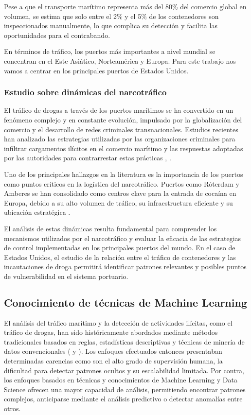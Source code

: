 \documentclass[12pt]{article}
\begin{document}
		Pese a que el transporte marítimo representa más del 80\% del comercio global en volumen, se estima que solo entre el 2\% y el 5\% de los contenedores son inspeccionados manualmente, lo que complica su detección y facilita las oportunidades para el contrabando.
		
		En términos de tráfico, los puertos más importantes a nivel mundial se concentran en el Este Asiático, Norteamérica y Europa. Para este trabajo nos vamos a centrar en los principales puertos de Estados Unidos.
		
		
		\subsubsection{Estudio sobre dinámicas del narcotráfico}
		El tráfico de drogas a través de los puertos marítimos se ha convertido en un fenómeno complejo y en constante evolución, impulsado por la globalización del comercio y el desarrollo de redes criminales transnacionales. Estudios recientes han analizado las estrategias utilizadas por las organizaciones criminales para infiltrar cargamentos ilícitos en el comercio marítimo y las respuestas adoptadas por las autoridades para contrarrestar estas prácticas \cite{coufal2023cities}, \cite{serra2023drugsmuggling}.
		
		Uno de los principales hallazgos en la literatura es la importancia de los puertos como puntos críticos en la logística del narcotráfico. Puertos como Róterdam y Amberes se han consolidado como centros clave para la entrada de cocaína en Europa, debido a su alto volumen de tráfico, su infraestructura eficiente y su ubicación estratégica \cite{coufal2023cities}.
		
		El análisis de estas dinámicas resulta fundamental para comprender los mecanismos utilizados por el narcotráfico y evaluar la eficacia de las estrategias de control implementadas en los principales puertos del mundo. En el caso de Estados Unidos, el estudio de la relación entre el tráfico de contenedores y las incautaciones de droga permitirá identificar patrones relevantes y posibles puntos de vulnerabilidad en el sistema portuario.


	\subsection{\label{conocimientosml}Conocimiento de técnicas de Machine Learning}
	El análisis del tráfico marítimo y la detección de actividades ilícitas, como el tráfico de drogas, han sido históricamente abordados mediante métodos tradicionales basados en reglas, estadísticas descriptivas y técnicas de minería de datos convencionales (\cite{article_ortiz} y \cite{Kretschmann2020}). Los enfoques efectuados entonces presentaban determinadas carencias como son el alto grado de supervisión humana, la dificultad para detectar patrones ocultos y su escalabilidad limitada.
	Por contra, los enfoques basados en técnicas y conocimientos de Machine Learning y Data Science ofrecen una mayor capacidad de análisis, permitiendo encontrar patrones complejos, anticiparse mediante el análisis predictivo o detectar anomalías entre otros.
	
\end{document}
